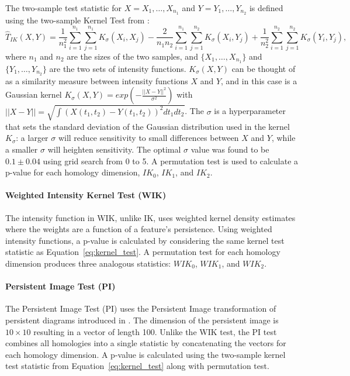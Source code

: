 \documentclass[12pt]{article}
\begin{document}
 The two-sample test statistic for $X = X_1, \ldots, X_{n_1}$ and $Y = Y_1, \ldots, Y_{n_2}$ is defined using the two-sample Kernel Test from \cite{gretton2012kernel}:
%
\begin{equation}
\widehat{T}_{IK}(X, Y) = \frac{1}{n_1^{2}}\sum_{i=1}^{n_1}\sum_{j=1}^{n_1} K_{\sigma}(X_{i}, X_{j}) - \frac{2}{n_1n_2}\sum_{i=1}^{n_1}\sum_{j=1}^{n_2}K_{\sigma}(X_{i}, Y_{j}) + \frac{1}{n_2^{2}}\sum_{i=1}^{n_2}\sum_{j=1}^{n_2} K_{\sigma}(Y_{i}, Y_{j}), \label{eq:kernel_test}
\end{equation} where $n_1$ and $n_2$ are the sizes of the two samples, and $\{X_1, \ldots, X_{n_1}\}$ and $\{Y_1, \ldots, Y_{n_2}\}$ are the two sets of intensity functions.  $K_{\sigma}(X,Y)$ can be thought of as a similarity measure between intensity functions $X$ and $Y$, and in this case is a Gaussian kernel $K_{\sigma}(X,Y) = exp(-\frac{||X - Y||^{2}}{\sigma^{2}})$ with  $||X - Y|| = \sqrt{\int \left(X(t_1, t_2) - Y(t_1, t_2)\right)^2dt_1dt_2}$. The $\sigma$ is a hyperparameter that sets the standard deviation of the Gaussian distribution used in the kernel $K_{\sigma}$: a larger $\sigma$ will reduce sensitivity to small differences between $X$ and $Y$, while a smaller $\sigma$ will heighten sensitivity. The optimal $\sigma$ value was found to be $0.1 \pm 0.04$ using grid search from 0 to 5. A permutation test is used to calculate a p-value for each homology dimension, $IK_0$, $IK_1$, and $IK_2$.


\paragraph{Weighted Intensity Kernel Test (WIK)}
The intensity function in WIK, unlike IK, uses weighted kernel density estimates \citep{chen2015statistical} where the weights are a function of a feature's persistence. 
Using weighted intensity functions, a p-value is calculated by considering the same kernel test statistic as Equation~\eqref{eq:kernel_test}. A permutation test for each homology dimension produces three analogous statistics: $WIK_0$, $WIK_1$, and $WIK_2$.






\paragraph{Persistent Image Test (PI)}   The Persistent Image Test (PI) uses the Persistent Image transformation of persistent diagrams introduced in \cite{adams2015persistent}. The dimension of the persistent image is $10 \times 10$ resulting in a vector of length 100.  Unlike the WIK test, the PI test combines all homologies into a single statistic by concatenating the vectors for each homology dimension.
A p-value is calculated using the two-sample kernel test statistic from Equation~\eqref{eq:kernel_test} along with permutation test.
\end{document}
